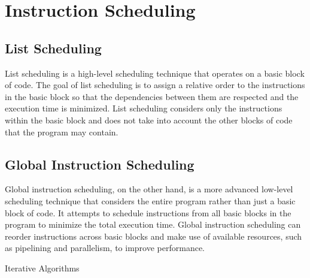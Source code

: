 \newpage




\section{Instruction Scheduling}


\subsection{List Scheduling}

List scheduling is a high-level scheduling technique that operates on a basic block of code. The goal of list scheduling is to assign a relative order to the instructions in the basic block so that the dependencies between them are respected and the execution time is minimized. List scheduling considers only the instructions within the basic block and does not take into account the other blocks of code that the program may contain.

\subsection{Global Instruction Scheduling}

Global instruction scheduling, on the other hand, is a more advanced low-level scheduling technique that considers the entire program rather than just a basic block of code. It attempts to schedule instructions from all basic blocks in the program to minimize the total execution time. Global instruction scheduling can reorder instructions across basic blocks and make use of available resources, such as pipelining and parallelism, to improve performance.



\begin{algorithm}
	\caption{Iterative Algorithms}\label{alg:Global Instruction Scheduling}
	\begin{algorithmic}
	\end{algorithmic}
\end{algorithm}



